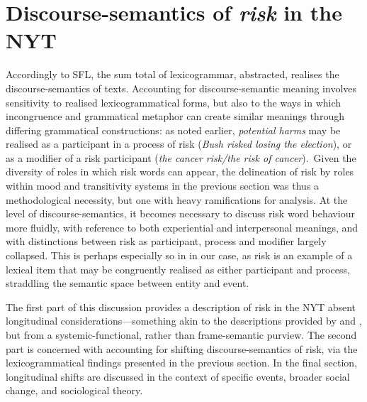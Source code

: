 
\chapter{Discourse-semantics of \emph{risk} in the NYT} \label{chap:discussion}

	Accordingly to SFL, the sum total of lexicogrammar, abstracted, realises the discourse-semantics of texts. Accounting for discourse-semantic meaning involves sensitivity to realised lexicogrammatical forms, but also to the ways in which incongruence and grammatical metaphor can create similar meanings through differing grammatical constructions: as noted earlier, \emph{potential harms} may be realised as a participant in a process of risk (\emph{Bush risked losing the election}), or as a modifier of a risk participant (\emph{the cancer risk\slash the risk of cancer}).~Given the diversity of roles in which risk words can appear, the delineation of risk by roles within mood and transitivity systems in the previous section was thus a methodological necessity, but one with heavy ramifications for analysis. At the level of discourse-semantics, it becomes necessary to discuss risk word behaviour more fluidly, with reference to both experiential and interpersonal meanings, and with distinctions between risk as participant, process and modifier largely collapsed. This is perhaps especially so in in our case, as risk is an example of a lexical item that may be congruently realised as either participant and process, straddling the semantic space between entity and event.

	The first part of this discussion provides a description of risk in the NYT absent longitudinal considerations---something akin to the descriptions provided by  and , but from a systemic-functional, rather than frame-semantic purview. The second part is concerned with accounting for shifting discourse-semantics of risk, via the lexicogrammatical findings presented in the previous section. In the final section, longitudinal shifts are discussed in the context of specific events, broader social change, and sociological theory.


